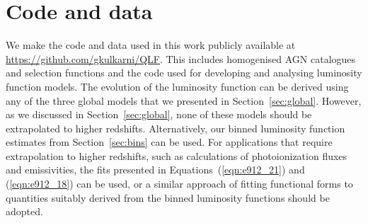 \documentclass[fleqn,usenatbib]{mnras}
\begin{document}
\section{Code and data}
\label{sec:code}

We make the code and data used in this work publicly available at
\url{https://github.com/gkulkarni/QLF}.  This includes homogenised AGN
catalogues and selection functions and the code used for developing
and analysing luminosity function models.  The evolution of the
luminosity function can be derived using any of the three global
models that we presented in Section~\ref{sec:global}.  However, as we
discussed in Section~\ref{sec:global}, none of these models should be
extrapolated to higher redshifts.  Alternatively, our binned
luminosity function estimates from Section~\ref{sec:bins} can be used.
For applications that require extrapolation to higher redshifts, such
as calculations of photoionization fluxes and emissivities, the fits
presented in Equations~(\ref{eqn:e912_21}) and (\ref{eqn:e912_18}) can
be used, or a similar approach of fitting functional forms to
quantities suitably derived from the binned luminosity functions
should be adopted.




\bsp
\label{lastpage}
\end{document}
